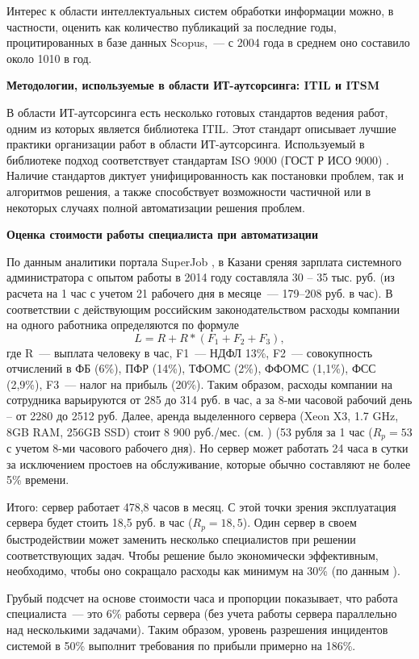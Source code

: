 Интерес к области интеллектуальных систем обработки информации можно, в частности, оценить как количество публикаций за последние годы, процитированных в базе данных Scopus,~--- с 2004 года в среднем оно составило около 1010 в год. \par
\textbf{Методологии, используемые в области ИТ-аутсорсинга: ITIL и ITSM} \par
В области ИТ-аутсорсинга есть несколько готовых стандартов ведения работ, одним из которых является библиотека ITIL. Этот стандарт описывает лучшие практики организации работ в области ИТ-аутсорсинга. Используемый в библиотеке подход соответствует стандартам ISO 9000 (ГОСТ Р ИСО 9000) \cite{ITIL1, ITIL2, ITIL3}.
Наличие стандартов диктует унифицированность как постановки проблем, так и алгоритмов решения, а также способствует возможности частичной или в некоторых случаях полной автоматизации решения проблем. \par
\clearpage
\textbf{Оценка стоимости работы специалиста при автоматизации} \par
По данным аналитики портала SuperJob \cite{SuperJob}, в Казани среняя зарплата системного администратора с опытом работы в 2014 году составляла 30 – 35 тыс. руб. (из расчета на 1 час с учетом 21 рабочего дня в месяце~--- 179--208 руб. в час). В соответствии с действующим российским законодательством \cite{FiscalCodecs} расходы компании на одного работника определяются по формуле
\[
L = R + R*(F_1 +F_2+F_3),
\]
где R~--- выплата человеку в час, F1~--- НДФЛ 13\%, F2~--- совокупность отчислений в ФБ (6\%), ПФР (14\%), ТФОМС (2\%), ФФОМС (1,1\%), ФСС (2,9\%), F3~--- налог на прибыль (20\%). Таким образом, расходы компании на сотрудника варьируются от 285 до 314 руб. в час, а за 8-ми часовой рабочий день – от 2280 до 2512 руб. Далее, аренда выделенного сервера (Xeon X3, 1.7 GHz, 8GB RAM, 256GB SSD) стоит 8 900 руб./мес. (см. \cite{TimeWeb}) (53 рубля за 1 час ($R_p=53$ с учетом 8-ми часового рабочего дня). Но сервер может работать 24 часа в сутки за исключением простоев на обслуживание, которые обычно составляют не более 5\% времени. \par Итого: сервер работает 478,8 часов в месяц. С этой точки зрения эксплуатация сервера будет стоить 18,5 руб. в час ($R_p=18,5$). Один сервер в своем быстродействии может заменить несколько специалистов при решении соответствующих задач. Чтобы решение было экономически эффективным, необходимо, чтобы оно сокращало расходы как минимум на 30\% (по данным \icl). \par Грубый подсчет на основе стоимости часа и пропорции показывает, что работа специалиста~--- это 6\% работы сервера (без учета работы сервера параллельно над несколькими задачами). Таким образом, уровень разрешения инцидентов системой в 50\% выполнит требования по прибыли примерно на 186\%.

